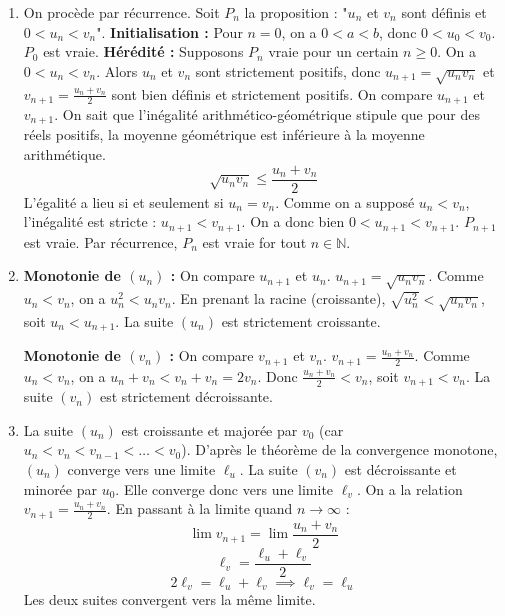 \documentclass[solutions]{exercices}
\begin{document}
\begin{solution}
	\begin{enumerate}
		\item On procède par récurrence. Soit $P_n$ la proposition : "$u_n$ et $v_n$ sont définis et $0 < u_n < v_n$".
		      \textbf{Initialisation :} Pour $n=0$, on a $0 < a < b$, donc $0 < u_0 < v_0$. $P_0$ est vraie.
		      \textbf{Hérédité :} Supposons $P_n$ vraie pour un certain $n \ge 0$. On a $0 < u_n < v_n$.
		      Alors $u_n$ et $v_n$ sont strictement positifs, donc $u_{n+1}=\sqrt{u_n v_n}$ et $v_{n+1}=\frac{u_n+v_n}{2}$ sont bien définis et strictement positifs.
		      On compare $u_{n+1}$ et $v_{n+1}$. On sait que l'inégalité arithmético-géométrique stipule que pour des réels positifs, la moyenne géométrique est inférieure à la moyenne arithmétique.
		      \[ \sqrt{u_n v_n} \le \frac{u_n+v_n}{2} \]
		      L'égalité a lieu si et seulement si $u_n=v_n$. Comme on a supposé $u_n < v_n$, l'inégalité est stricte : $u_{n+1} < v_{n+1}$.
		      On a donc bien $0 < u_{n+1} < v_{n+1}$. $P_{n+1}$ est vraie.
		      Par récurrence, $P_n$ est vraie for tout $n \in \mathbb{N}$.
		\item \textbf{Monotonie de $(u_n)$ :} On compare $u_{n+1}$ et $u_n$.
		      $u_{n+1} = \sqrt{u_n v_n}$. Comme $u_n < v_n$, on a $u_n^2 < u_n v_n$. En prenant la racine (croissante), $\sqrt{u_n^2} < \sqrt{u_n v_n}$, soit $u_n < u_{n+1}$. La suite $(u_n)$ est strictement croissante.

		      \textbf{Monotonie de $(v_n)$ :} On compare $v_{n+1}$ et $v_n$.
		      $v_{n+1} = \frac{u_n+v_n}{2}$. Comme $u_n < v_n$, on a $u_n+v_n < v_n+v_n = 2v_n$. Donc $\frac{u_n+v_n}{2} < v_n$, soit $v_{n+1} < v_n$. La suite $(v_n)$ est strictement décroissante.
		\item La suite $(u_n)$ est croissante et majorée par $v_0$ (car $u_n < v_n < v_{n-1} < \dots < v_0$). D'après le théorème de la convergence monotone, $(u_n)$ converge vers une limite $\ell_u$.
		      La suite $(v_n)$ est décroissante et minorée par $u_0$. Elle converge donc vers une limite $\ell_v$.
		      On a la relation $v_{n+1} = \frac{u_n+v_n}{2}$. En passant à la limite quand $n \to \infty$ :
		      \[ \lim v_{n+1} = \lim \frac{u_n+v_n}{2} \]
		      \[ \ell_v = \frac{\ell_u + \ell_v}{2} \]
		      \[ 2\ell_v = \ell_u + \ell_v \implies \ell_v = \ell_u \]
		      Les deux suites convergent vers la même limite.
	\end{enumerate}
\end{solution}
\end{document}
